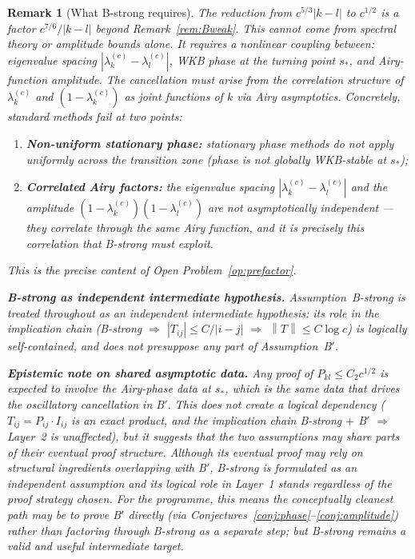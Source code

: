 \documentclass[12pt,a4paper]{article}
\newtheorem{remark}[theorem]{Remark}
\newcommand{\norm}[1]{\left\|#1\right\|}
\newcommand{\lam}[1]{\lambda_{#1}^{(c)}}
\begin{document}
\begin{remark}[What B-strong requires]
\label{rem:Bstrong_content}
The reduction from $c^{5/3}|k-l|$ to $c^{1/2}$ is a factor
$c^{7/6}/|k-l|$ beyond Remark~\ref{rem:Bweak}.
This cannot come from spectral theory or amplitude bounds alone.
It requires a \emph{nonlinear coupling} between:
eigenvalue spacing $|\lam{k}-\lam{l}|$,
WKB phase at the turning point $s_*$, and
Airy-function amplitude.
The cancellation must arise from the correlation structure of
$\lam{k}$ and $(1-\lam{k})$ as joint functions of $k$ via
Airy asymptotics.
Concretely, standard methods fail at two points:
\begin{enumerate}[nosep,label=(\alph*)]
  \item \textbf{Non-uniform stationary phase:}
        stationary phase methods do not apply uniformly
        across the transition zone (phase is not globally
        WKB-stable at $s_*$);
  \item \textbf{Correlated Airy factors:}
        the eigenvalue spacing $|\lam{k}-\lam{l}|$
        and the amplitude $(1-\lam{k})(1-\lam{l})$
        are not asymptotically independent ---
        they correlate through the same Airy function,
        and it is precisely this correlation that B-strong
        must exploit.
\end{enumerate}
This is the precise content of Open Problem~\ref{op:prefactor}.

\medskip\noindent
\textbf{B-strong as independent intermediate hypothesis.}
Assumption~B-strong is treated throughout as an independent
intermediate hypothesis: its role in the implication chain
(B-strong $\Rightarrow$ $|T_{ij}|\leq C/|i-j|$ $\Rightarrow$
$\norm{T}\leq C\log c$) is logically self-contained,
and does not presuppose any part of Assumption~B$'$.

\medskip\noindent
\textbf{Epistemic note on shared asymptotic data.}
Any proof of $P_{kl}\leq C_2c^{1/2}$ is expected to involve
the Airy-phase data at $s_*$, which is the same data
that drives the oscillatory cancellation in B$'$.
This does not create a logical dependency
($T_{ij}=P_{ij}\cdot I_{ij}$ is an exact product,
and the implication chain B-strong $+$ B$'$ $\Rightarrow$ Layer~2
is unaffected),
but it suggests that the two assumptions may share
parts of their eventual proof structure.
Although its eventual proof may rely on structural ingredients
overlapping with B$'$, B-strong is formulated as an
independent assumption and its logical role in Layer~1
stands regardless of the proof strategy chosen.
For the programme, this means the conceptually cleanest
path may be to prove B$'$ directly
(via Conjectures~\ref{conj:phase}--\ref{conj:amplitude})
rather than factoring through B-strong as a separate step;
but B-strong remains a valid and useful intermediate target.
\end{remark}
\end{document}
